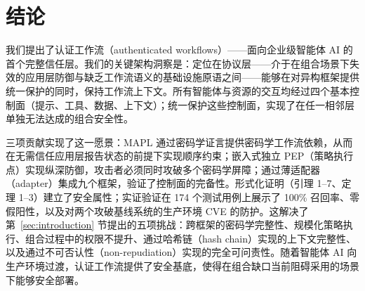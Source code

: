 \section{结论}
\label{sec:conclusion}

我们提出了认证工作流（authenticated workflows）——面向企业级智能体 AI 的首个完整信任层。我们的关键架构洞察是：定位在协议层——介于在组合场景下失效的应用层防御与缺乏工作流语义的基础设施原语之间——能够在对异构框架提供统一保护的同时，保持工作流上下文。所有智能体与资源的交互均经过四个基本控制面（提示、工具、数据、上下文）；统一保护这些控制面，实现了在任一相邻层单独无法达成的组合安全性。

三项贡献实现了这一愿景：MAPL 通过密码学证言提供密码学工作流依赖，从而在无需信任应用层报告状态的前提下实现顺序约束；嵌入式独立 PEP（策略执行点）实现纵深防御，攻击者必须同时攻破多个密码学屏障；通过薄适配器（adapter）集成九个框架，验证了控制面的完备性。形式化证明（引理 1--7、定理 1--3）建立了安全属性；实证验证在 174 个测试用例上展示了 100\% 召回率、零假阳性，以及对两个攻破基线系统的生产环境 CVE 的防护。这解决了第~\ref{sec:introduction} 节提出的五项挑战：跨框架的密码学完整性、规模化策略执行、组合过程中的权限不提升、通过哈希链（hash chain）实现的上下文完整性、以及通过不可否认性（non-repudiation）实现的完全可问责性。随着智能体 AI 向生产环境过渡，认证工作流提供了安全基底，使得在组合缺口当前阻碍采用的场景下能够安全部署。
